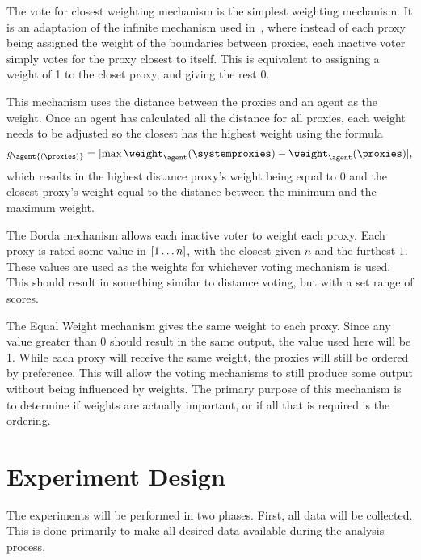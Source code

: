 \label{para:closest}
The vote for closest weighting mechanism is the simplest weighting mechanism.
It is an adaptation of the infinite mechanism used in~\cite{Cohensius2017},
where instead of each proxy being assigned the weight of the boundaries
between proxies, each inactive voter simply votes for the proxy closest to
itself.
This is equivalent to assigning a weight of 1 to the closet proxy, and giving
the rest 0.

\label{para:distance-voting}
This mechanism uses the distance between the proxies and an agent as the weight.
Once an agent has calculated all the distance for all proxies,
each weight needs to be adjusted so the closest has the highest weight using
the formula
\begin{equation}
    g_\agent{(\proxies)} = \lvert
    \max{\weight_{\agent}{(\systemproxies)}} - \weight_{\agent}{(\proxies)}
    \rvert
    \text{,}\label{eq:distance-voting-adjustment}
\end{equation}
which results in the highest distance proxy's weight being equal to 0 and the
closest proxy's weight equal to the distance between the minimum and the
maximum weight.

\label{para:borda}
The Borda mechanism allows each inactive voter to weight each proxy.
Each proxy is rated some value in $[1 \mathellipsis n]$, with the closest
given $n$ and the furthest $1$.
These values are used as the weights for whichever voting mechanism is used.
This should result in something similar to distance voting, but with a set
range of scores.

\label{para:equal-weight}
The Equal Weight mechanism gives the same weight to each proxy.
Since any value greater than 0 should result in the same output, the value used here
will be 1.
While each proxy will receive the same weight, the proxies will still be ordered by
preference.
This will allow the voting mechanisms to still produce some output without being
influenced by weights.
The primary purpose of this mechanism is to determine if weights are actually
important, or if all that is required is the ordering.

\section{Experiment Design}\label{sec:experiment-design}
The experiments will be performed in two phases.
First, all data will be collected.
This is done primarily to make all desired data available during the analysis
process.

